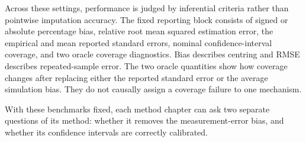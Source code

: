 Across these settings, performance is judged by inferential criteria rather than pointwise imputation accuracy. The fixed reporting block consists of signed or absolute percentage bias, relative root mean squared estimation error, the empirical and mean reported standard errors, nominal confidence-interval coverage, and two oracle coverage diagnostics. Bias describes centring and RMSE describes repeated-sample error. The two oracle quantities show how coverage changes after replacing either the reported standard error or the average simulation bias. They do not causally assign a coverage failure to one mechanism.

With these benchmarks fixed, each method chapter can ask two separate questions of its method: whether it removes the measurement-error bias, and whether its confidence intervals are correctly calibrated.

